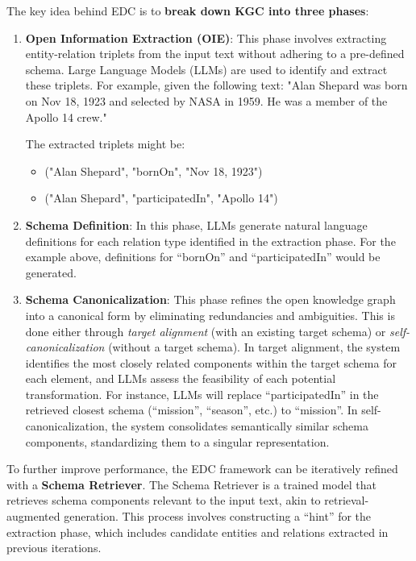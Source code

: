 The key idea behind EDC is to \textbf{break down KGC into three phases}:

\begin{enumerate}
    \item \textbf{Open Information Extraction (OIE)}: 
    This phase involves extracting entity-relation triplets from the input text without adhering to a pre-defined schema. Large Language Models (LLMs) are used to identify and extract these triplets. For example, given the following text:
        "Alan Shepard was born on Nov 18, 1923 and selected by NASA in 1959. He was a member of the Apollo 14 crew."


    The extracted triplets might be:
    \begin{itemize}
        \item ("Alan Shepard", "bornOn", "Nov 18, 1923")
        \item ("Alan Shepard", "participatedIn", "Apollo 14")
    \end{itemize}
    
    \item \textbf{Schema Definition}: 
    In this phase, LLMs generate natural language definitions for each relation type identified in the extraction phase. For the example above, definitions for ``bornOn'' and ``participatedIn'' would be generated.

    \item \textbf{Schema Canonicalization}: 
    This phase refines the open knowledge graph into a canonical form by eliminating redundancies and ambiguities. This is done either through \textit{target alignment} (with an existing target schema) or \textit{self-canonicalization} (without a target schema). In target alignment, the system identifies the most closely related components within the target schema for each element, and LLMs assess the feasibility of each potential transformation. For instance,  LLMs will replace ``participatedIn'' in the retrieved closest schema (``mission'', ``season'', etc.) to ``mission''. In self-canonicalization, the system consolidates semantically similar schema components, standardizing them to a singular representation.
\end{enumerate}

To further improve performance, the EDC framework can be iteratively refined with a \textbf{Schema Retriever}. The Schema Retriever is a trained model that retrieves schema components relevant to the input text, akin to retrieval-augmented generation. This process involves constructing a ``hint'' for the extraction phase, which includes candidate entities and relations extracted in previous iterations.

